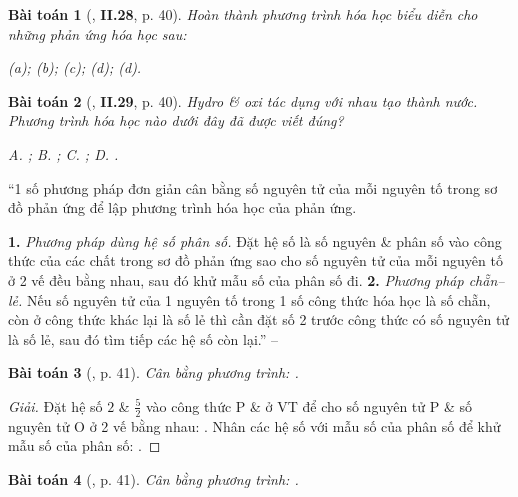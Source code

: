 \documentclass{article}
\numberwithin{equation}{section}
\newtheorem{baitoan}{Bài toán}
\begin{document}
\begin{baitoan}[\cite{Truong_BTNC_Hoa_Hoc_8_2022}, \textbf{II.28}, p. 40]
	Hoàn thành phương trình hóa học biểu diễn cho những phản ứng hóa học sau:
	
		(a)\emph{};
		(b)\emph{};
		(c)\emph{};
		(d)\emph{};
		(d)\emph{}.
	
\end{baitoan}

\begin{baitoan}[\cite{Truong_BTNC_Hoa_Hoc_8_2022}, \textbf{II.29}, p. 40]
	Hydro \& oxi tác dụng với nhau tạo thành nước. Phương trình hóa học nào dưới đây đã được viết đúng?
	
		{\sf A.} \emph{};
		{\sf B.} \emph{};
		{\sf C.} \emph{};
		{\sf D.} \emph{}.
	
\end{baitoan}
``1 số phương pháp đơn giản cân bằng số nguyên tử của mỗi nguyên tố trong sơ đồ phản ứng để lập phương trình hóa học của phản ứng.

	{\bf 1.} \textit{Phương pháp dùng hệ số phân số.} Đặt hệ số là số nguyên \& phân số vào công thức của các chất trong sơ đồ phản ứng sao cho số nguyên tử của mỗi nguyên tố ở 2 vế đều bằng nhau, sau đó khử mẫu số của phân số đi.
	{\bf 2.} \textit{Phương pháp chẵn--lẻ.} Nếu số nguyên tử của 1 nguyên tố trong 1 số công thức hóa học là số chẵn, còn ở công thức khác lại là số lẻ thì cần đặt số 2 trước công thức có số nguyên tử là số lẻ, sau đó tìm tiếp các hệ số còn lại.'' -- \cite[p. 41]{Truong_BTNC_Hoa_Hoc_8_2022}


\begin{baitoan}[\cite{Truong_BTNC_Hoa_Hoc_8_2022}, p. 41]
	Cân bằng phương trình: \emph{}.
\end{baitoan}

\begin{proof}[Giải]
	Đặt hệ số $2$ \& $\frac{5}{2}$ vào công thức P \&  ở VT để cho số nguyên tử P \& số nguyên tử O ở 2 vế bằng nhau: . Nhân các hệ số với mẫu số của phân số để khử mẫu số của phân số: .
\end{proof}

\begin{baitoan}[\cite{Truong_BTNC_Hoa_Hoc_8_2022}, p. 41]
	Cân bằng phương trình: \emph{}.
\end{baitoan}
\end{document}
